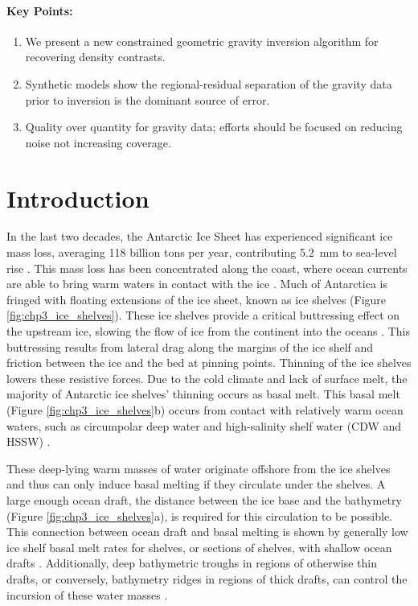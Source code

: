 \paragraph*{Key Points:}
\begin{enumerate}
    \item We present a new constrained geometric gravity inversion algorithm for recovering density contrasts.
    \item Synthetic models show the regional-residual separation of the gravity data prior to inversion is the dominant source of error.
    \item Quality over quantity for gravity data; efforts should be focused on reducing noise not increasing coverage.
\end{enumerate}

\section{Introduction}

In the last two decades, the Antarctic Ice Sheet has experienced significant ice mass loss, averaging 118 billion tons per year, contributing 5.2~mm to sea-level rise \citep{smithpervasive2020}. This mass loss has been concentrated along the coast, where ocean currents are able to bring warm waters in contact with the ice \citep{rignotfour2019}. Much of Antarctica is fringed with floating extensions of the ice sheet, known as ice shelves (Figure \ref{fig:chp3_ice_shelves}). These ice shelves provide a critical buttressing effect on the upstream ice, slowing the flow of ice from the continent into the oceans \citep{dupontassessment2005}. This buttressing results from lateral drag along the margins of the ice shelf and friction between the ice and the bed at pinning points. Thinning of the ice shelves lowers these resistive forces. Due to the cold climate and lack of surface melt, the majority of Antarctic ice shelves’ thinning occurs as basal melt. This basal melt (Figure \ref{fig:chp3_ice_shelves}b) occurs from contact with relatively warm ocean waters, such as circumpolar deep water and high-salinity shelf water (CDW and HSSW) \citep{rignotfour2019, jenkinsobservations2010}.

These deep-lying warm masses of water originate offshore from the ice shelves and thus can only induce basal melting if they circulate under the shelves. A large enough ocean draft, the distance between the ice base and the bathymetry (Figure \ref{fig:chp3_ice_shelves}a), is required for this circulation to be possible. This connection between ocean draft and basal melting is shown by generally low ice shelf basal melt rates for shelves, or sections of shelves, with shallow ocean drafts \citep[e.g.][]{tintoross2019, pritchardantarctic2012}. Additionally, deep bathymetric troughs in regions of otherwise thin drafts, or conversely, bathymetry ridges in regions of thick drafts, can control the incursion of these water masses \citep{st-laurentrole2013, yangbathymetry2021}.

